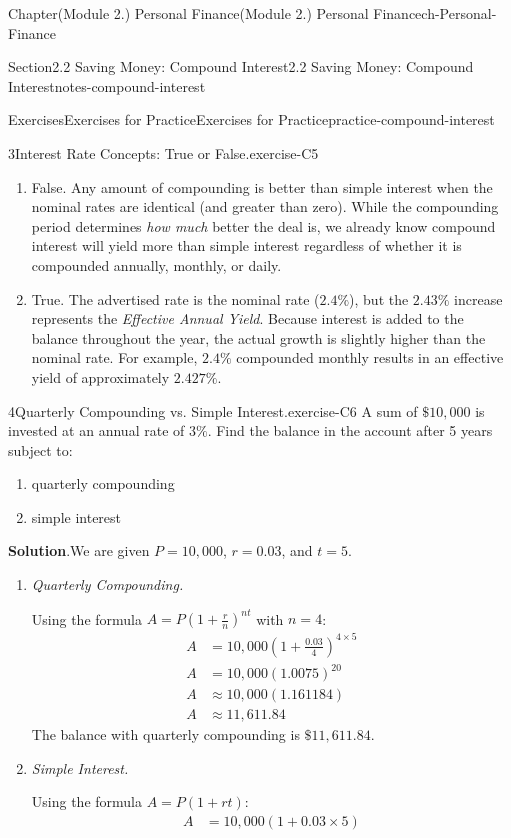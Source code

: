 \documentclass[oneside,10pt,]{book}
\newcommand{\blocktitlefont}{\relax}
\newcommand{\lititle}[1]{{\slshape#1}}
\newcommand{\amp}{&}
\begin{document}
\begin{chapterptx}{Chapter}{(Module 2.) Personal Finance}{}{(Module 2.) Personal Finance}{}{}{ch-Personal-Finance}
\begin{sectionptx}{Section}{2.2 Saving Money: Compound Interest}{}{2.2 Saving Money: Compound Interest}{}{}{notes-compound-interest}
\begin{exercises-subsection-numberless}{Exercises}{Exercises for Practice}{}{Exercises for Practice}{}{}{practice-compound-interest}
\begin{divisionexercise}{3}{Interest Rate Concepts: True or False.}{}{exercise-C5}
\begin{enumerate}[label={\arabic*}]
\item{}False. Any amount of compounding is better than simple interest when the nominal rates are identical (and greater than zero). While the compounding period determines \emph{how much} better the deal is, we already know compound interest will yield more than simple interest regardless of whether it is compounded annually, monthly, or daily.%
\item{}True. The advertised rate is the nominal rate (\(2.4\%\)), but the \(2.43\%\) increase represents the \emph{Effective Annual Yield}. Because interest is added to the balance throughout the year, the actual growth is slightly higher than the nominal rate. For example, \(2.4\%\) compounded monthly results in an effective yield of approximately \(2.427\%\).%
\end{enumerate}
%
\end{divisionexercise}%
\begin{divisionexercise}{4}{Quarterly Compounding vs. Simple Interest.}{}{exercise-C6}%
A sum of \(\$10,000\) is invested at an annual rate of \(3\%\). Find the balance in the account after 5 years subject to:%
\begin{enumerate}[label={\arabic*}]
\item{}quarterly compounding%
\item{}simple interest%
\end{enumerate}
%
\par\smallskip%
\noindent\textbf{\blocktitlefont Solution}.\hypertarget{exercise-C6-3}{}\quad{}We are given \(P = 10,000\), \(r = 0.03\), and \(t = 5\).%
\par
%
\begin{enumerate}[label={\arabic*}]
\item{}\lititle{Quarterly Compounding.}\par%
Using the formula \(A = P(1 + \frac{r}{n})^{nt}\) with \(n = 4\):%
\begin{align*}
A \amp = 10,000\left(1 + \frac{0.03}{4}\right)^{4 \times 5}\\
A \amp = 10,000(1.0075)^{20}\\
A \amp \approx 10,000(1.161184)\\
A \amp \approx 11,611.84
\end{align*}
The balance with quarterly compounding is \(\$11,611.84\).%
\item{}\lititle{Simple Interest.}\par%
Using the formula \(A = P(1 + rt)\):%
\begin{align*}
A \amp = 10,000(1 + 0.03 \times 5)\\

\end{align*}
\end{enumerate}
\end{divisionexercise}
\end{exercises-subsection-numberless}
\end{sectionptx}
\end{chapterptx}
\end{document}
